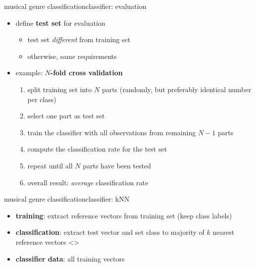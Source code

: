         \begin{frame}{musical genre classification}{classifier: evaluation}
            \begin{itemize}
                \item	define \textbf{test set} for evaluation
                    \begin{itemize}
                        \item	test set \textit{different} from training set
                        \item	otherwise, same requirements
                    \end{itemize}
                
                \item<2->	example: \textbf{$N$-fold cross validation}
                    \begin{enumerate}
                        \item	split training set into $N$ parts (randomly, but preferably identical number per class)
                        \pause
                        \item	select one part as test set
                        \pause
                        \item	train the classifier with all observations from remaining $N-1$ parts
                        \pause
                        \item	compute the classification rate for the test set
                        \pause
                        \item	repeat until all $N$ parts have been tested
                        \pause
                        \item	overall result: \textit{average} classification rate
                    \end{enumerate}
            \end{itemize}
        \end{frame}
        \begin{frame}{musical genre classification}{classifier: kNN}
            \begin{itemize}
                \item	\textbf{training}: extract reference vectors from training set (keep class labels)
                \item<2->	\textbf{classification}: extract test vector and set class to majority of $k$ nearest reference vectors
                \setcounter{i}{1}
                \setcounter{j}{2}
                {
                    \only<\value{j}>{}
                }
                \item<6->	\textbf{classifier data}: all training vectors
            \end{itemize}
        \end{frame}
